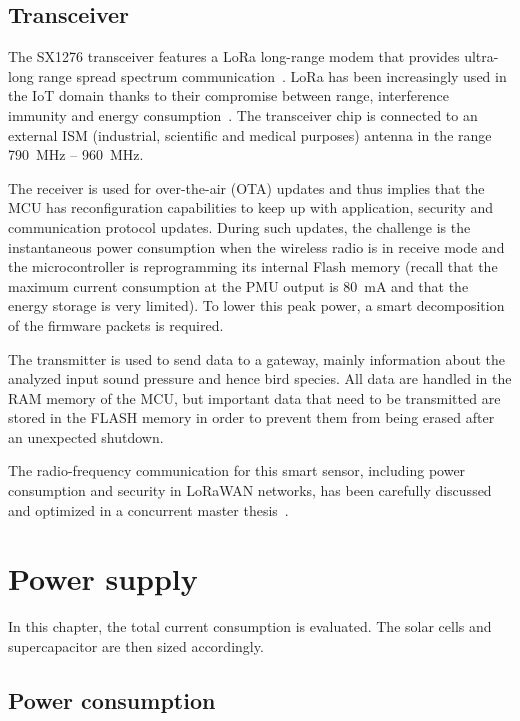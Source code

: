 \documentclass{EPL-master-thesis-covers-EN}
\begin{document}
\section{Transceiver}

The SX1276 transceiver features a LoRa long-range modem that provides ultra-long range spread spectrum communication~\cite{SX1276}. LoRa has been increasingly used in the IoT domain thanks to their compromise between range, interference immunity and energy consumption~\cite{SINHA201714}. The transceiver chip is connected to an external ISM (industrial, scientific and medical purposes) antenna in the range \SI{790}{MHz} -- \SI{960}{MHz}.

The receiver is used for over-the-air (OTA) updates and thus implies that the MCU has reconfiguration capabilities to keep up with application, security and communication protocol updates. During such updates, the challenge is the instantaneous power consumption when the wireless radio is in receive mode and the microcontroller is reprogramming its internal Flash memory (recall that the maximum current consumption at the PMU output is \SI{80}{mA} and that the energy storage is very limited). To lower this peak power, a smart decomposition of the firmware packets is required.

The transmitter is used to send data to a gateway, mainly information about the analyzed input sound pressure and hence bird species. All data are handled in the RAM memory of the MCU, but important data that need to be transmitted are stored in the FLASH memory in order to prevent them from being erased after an unexpected shutdown.

The radio-frequency communication for this smart sensor, including power consumption and security in LoRaWAN networks, has been carefully discussed and optimized in a concurrent master thesis~\cite{Hess2020}.


\chapter{Power supply}

In this chapter, the total current consumption is evaluated. The solar cells and supercapacitor are then sized accordingly.

\section{Power consumption}
\label{section:power_consumption}
\end{document}
